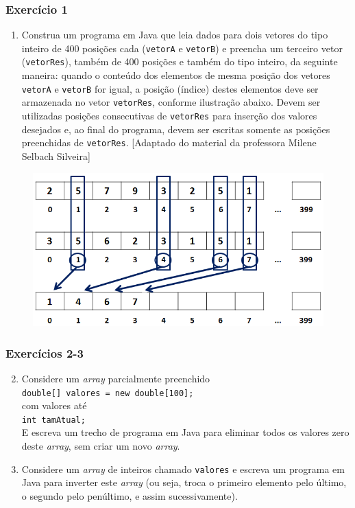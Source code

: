 \documentclass[xcolor={dvipsnames,table},aspectratio=169]{beamer}
\begin{document}
\begin{frame}\frametitle{Exercício 1}
{\scriptsize
\begin{enumerate}
\item Construa um programa em Java que leia dados para dois vetores do tipo inteiro de 400 posições cada (\texttt{vetorA} e \texttt{vetorB}) e preencha um terceiro vetor (\texttt{vetorRes}), também de 400 posições e também do tipo inteiro, da seguinte maneira: quando o conteúdo dos elementos de mesma posição dos vetores \texttt{vetorA} e \texttt{vetorB} for igual, a posição (índice) destes elementos deve ser armazenada no vetor \texttt{vetorRes}, conforme ilustração abaixo. Devem ser utilizadas posições consecutivas de \texttt{vetorRes} para inserção dos valores desejados e, ao final do programa, devem ser escritas somente as posições preenchidas de \texttt{vetorRes}. [Adaptado do material da professora Milene Selbach Silveira]
\end{enumerate}
}
\begin{figure}[h]
	\includegraphics[height=0.40\paperheight,center]{pucrs-ep-fprog-unidade_06-arrays-laminas-exercicio.png}
\end{figure}
\end{frame}

\begin{frame}\frametitle{Exercícios 2-3}
\begin{enumerate}
\setcounter{enumi}{1}
\item Considere um \emph{array} parcialmente preenchido\\
\texttt{double[] valores = new double[100];}\\
com valores até\\
\texttt{int tamAtual;}\\
E escreva um trecho de programa em Java para eliminar todos os valores zero deste \emph{array}, sem criar um novo \emph{array}.
\item Considere um \emph{array} de inteiros chamado \texttt{valores} e escreva um programa em Java para inverter este \emph{array} (ou seja, troca o primeiro elemento pelo último, o segundo pelo penúltimo, e assim sucessivamente).
\end{enumerate}
\end{frame}
\end{document}
